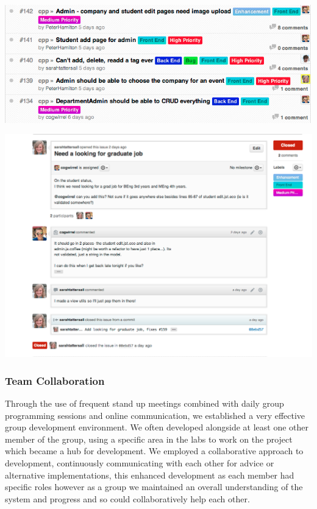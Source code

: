     \begin{center}
    \includegraphics[scale=0.3]{images/project_management/team_management/github_issues}

    \includegraphics[scale=0.3]{images/project_management/team_management/graduate_issue}
    \end{center}


  \subsubsection{Team Collaboration}
    Through the use of frequent stand up meetings combined with daily group programming sessions and online communication, we established a very effective group development environment. We often developed alongside at least one other member of the group, using a specific area in the labs to work on the project which became a hub for development. We employed a collaborative approach to development, continuously communicating with each other for advice or alternative implementations, this enhanced development as each member had specific roles however as a group we maintained an overall understanding of the system and progress and so could collaboratively help each other.

